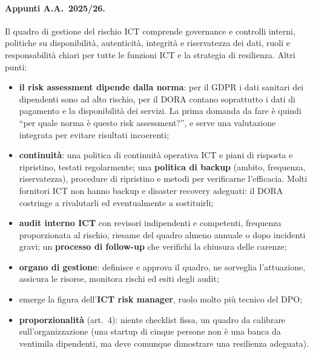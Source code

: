 \paragraph{Appunti A.A.~2025/26.} Il quadro di gestione del rischio ICT comprende governance e controlli
interni, politiche su disponibilità, autenticità, integrità e riservatezza dei dati, ruoli e
responsabilità chiari per tutte le funzioni ICT e la strategia di resilienza. Altri punti:
\begin{itemize}
  \item \textbf{il risk assessment dipende dalla norma}: per il GDPR i dati sanitari dei dipendenti
    sono ad alto rischio, per il DORA contano soprattutto i dati di pagamento e la disponibilità dei
    servizi. La prima domanda da fare è quindi ``per quale norma è questo risk assessment?'', e serve
    una valutazione integrata per evitare risultati incoerenti;
  \item \textbf{continuità}: una politica di continuità operativa ICT e piani di risposta e ripristino,
    testati regolarmente; una \textbf{politica di backup} (ambito, frequenza, riservatezza), procedure
    di ripristino e metodi per verificarne l'efficacia. Molti fornitori ICT non hanno backup e disaster
    recovery adeguati: il DORA costringe a rivalutarli ed eventualmente a sostituirli;
  \item \textbf{audit interno ICT} con revisori indipendenti e competenti, frequenza proporzionata al
    rischio, riesame del quadro almeno annuale o dopo incidenti gravi; un \textbf{processo di
    follow-up} che verifichi la chiusura delle carenze;
  \item \textbf{organo di gestione}: definisce e approva il quadro, ne sorveglia l'attuazione,
    assicura le risorse, monitora rischi ed esiti degli audit;
  \item emerge la figura dell'\textbf{ICT risk manager}, ruolo molto più tecnico del DPO;
  \item \textbf{proporzionalità} (art.~4): niente checklist fissa, un quadro da calibrare
    sull'organizzazione (una startup di cinque persone non è una banca da ventimila dipendenti, ma deve
    comunque dimostrare una resilienza adeguata).
\end{itemize}

